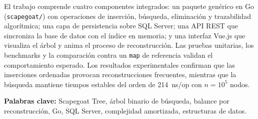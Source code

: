 \documentclass[12pt,a4paper,oneside]{report}
\begin{document}
El trabajo comprende cuatro componentes integrados: un paquete genérico en Go (\texttt{scapegoat/}) con operaciones de inserción, búsqueda, eliminación y trazabilidad algorítmica; una capa de persistencia sobre SQL Server; una API REST que sincroniza la base de datos con el índice en memoria; y una interfaz Vue.js que visualiza el árbol y anima el proceso de reconstrucción. Las pruebas unitarias, los benchmarks y la comparación contra un \texttt{map} de referencia validan el comportamiento esperado. Los resultados experimentales confirman que las inserciones ordenadas provocan reconstrucciones frecuentes, mientras que la búsqueda mantiene tiempos estables del orden de 214~ns/op con $n = 10^5$ nodos.

\vspace{0.8em}
\noindent\textbf{Palabras clave:} Scapegoat Tree, árbol binario de búsqueda, balance por reconstrucción, Go, SQL Server, complejidad amortizada, estructuras de datos.

\tableofcontents
\listoffigures
\listoftables











\end{document}
